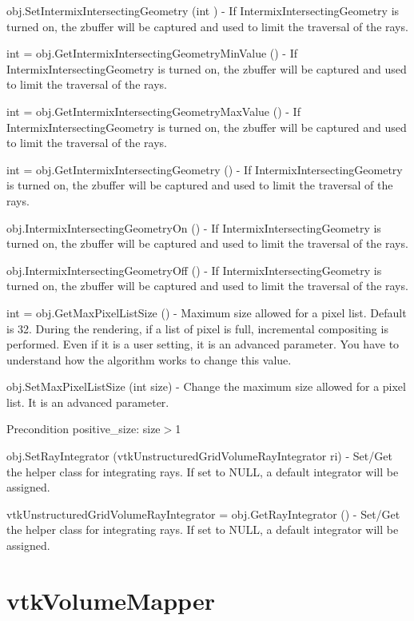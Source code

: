 \begin{DoxyItemize}
\item {\ttfamily obj.\-Set\-Intermix\-Intersecting\-Geometry (int )} -\/ If Intermix\-Intersecting\-Geometry is turned on, the zbuffer will be captured and used to limit the traversal of the rays.  
\item {\ttfamily int = obj.\-Get\-Intermix\-Intersecting\-Geometry\-Min\-Value ()} -\/ If Intermix\-Intersecting\-Geometry is turned on, the zbuffer will be captured and used to limit the traversal of the rays.  
\item {\ttfamily int = obj.\-Get\-Intermix\-Intersecting\-Geometry\-Max\-Value ()} -\/ If Intermix\-Intersecting\-Geometry is turned on, the zbuffer will be captured and used to limit the traversal of the rays.  
\item {\ttfamily int = obj.\-Get\-Intermix\-Intersecting\-Geometry ()} -\/ If Intermix\-Intersecting\-Geometry is turned on, the zbuffer will be captured and used to limit the traversal of the rays.  
\item {\ttfamily obj.\-Intermix\-Intersecting\-Geometry\-On ()} -\/ If Intermix\-Intersecting\-Geometry is turned on, the zbuffer will be captured and used to limit the traversal of the rays.  
\item {\ttfamily obj.\-Intermix\-Intersecting\-Geometry\-Off ()} -\/ If Intermix\-Intersecting\-Geometry is turned on, the zbuffer will be captured and used to limit the traversal of the rays.  
\item {\ttfamily int = obj.\-Get\-Max\-Pixel\-List\-Size ()} -\/ Maximum size allowed for a pixel list. Default is 32. During the rendering, if a list of pixel is full, incremental compositing is performed. Even if it is a user setting, it is an advanced parameter. You have to understand how the algorithm works to change this value.  
\item {\ttfamily obj.\-Set\-Max\-Pixel\-List\-Size (int size)} -\/ Change the maximum size allowed for a pixel list. It is an advanced parameter. \begin{DoxyPrecond}{Precondition}
positive\-\_\-size\-: size$>$1  
\end{DoxyPrecond}

\item {\ttfamily obj.\-Set\-Ray\-Integrator (vtk\-Unstructured\-Grid\-Volume\-Ray\-Integrator ri)} -\/ Set/\-Get the helper class for integrating rays. If set to N\-U\-L\-L, a default integrator will be assigned.  
\item {\ttfamily vtk\-Unstructured\-Grid\-Volume\-Ray\-Integrator = obj.\-Get\-Ray\-Integrator ()} -\/ Set/\-Get the helper class for integrating rays. If set to N\-U\-L\-L, a default integrator will be assigned.  
\end{DoxyItemize}\hypertarget{vtkvolumerendering_vtkvolumemapper}{}\section{vtk\-Volume\-Mapper}\label{vtkvolumerendering_vtkvolumemapper}
